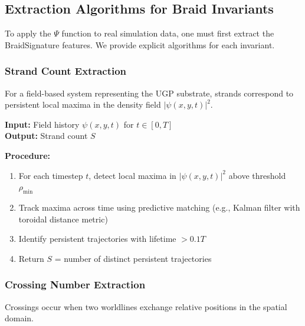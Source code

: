 \documentclass[11pt]{article}
\theoremstyle{remark}
\begin{document}
\subsection{Extraction Algorithms for Braid Invariants}

To apply the $\Psi$ function to real simulation data, one must first extract the BraidSignature features. We provide explicit algorithms for each invariant.

\subsubsection{Strand Count Extraction}

For a field-based system representing the UGP substrate, strands correspond to persistent local maxima in the density field $|\psi(x,y,t)|^2$.

\begin{tcolorbox}[colback=gray!5,colframe=gray!75!black,title=\textbf{Algorithm: Strand Count Extraction}]
\textbf{Input:} Field history $\psi(x,y,t)$ for $t \in [0,T]$ \\
\textbf{Output:} Strand count $S$

\textbf{Procedure:}
\begin{enumerate}
    \item For each timestep $t$, detect local maxima in $|\psi(x,y,t)|^2$ above threshold $\rho_{\text{min}}$
    \item Track maxima across time using predictive matching (e.g., Kalman filter with toroidal distance metric)
    \item Identify persistent trajectories with lifetime $> 0.1T$
    \item Return $S$ = number of distinct persistent trajectories
\end{enumerate}
\end{tcolorbox}

\subsubsection{Crossing Number Extraction}

Crossings occur when two worldlines exchange relative positions in the spatial domain.
\end{document}
